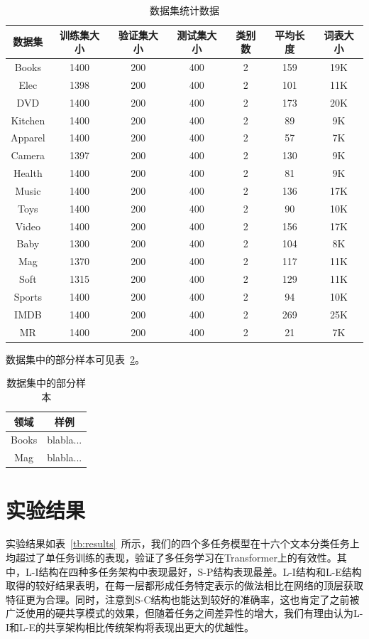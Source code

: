 \begin{table}[htb]
	\centering
	\caption{数据集统计数据}
	\begin{tabular}{ccccccc}
		\toprule[2pt]
		数据集&训练集大小&验证集大小&测试集大小&类别数&平均长度&词表大小\\
		\midrule[1pt]
		Books& 1400& 200& 400& 2& 159& 19K\\
		Elec& 1398& 200& 400& 2& 101& 11K\\
		DVD& 1400& 200& 400& 2& 173& 20K\\
		Kitchen& 1400& 200& 400& 2& 89& 9K\\
		Apparel& 1400& 200& 400& 2& 57& 7K\\
		Camera& 1397& 200& 400& 2& 130& 9K\\
		Health& 1400& 200& 400& 2& 81& 9K\\
		Music& 1400& 200& 400& 2& 136& 17K\\
		Toys& 1400& 200& 400& 2& 90& 10K\\
		Video& 1400& 200& 400& 2& 156& 17K\\
		Baby& 1300& 200& 400& 2& 104& 8K\\
		Mag& 1370& 200& 400& 2& 117& 11K\\
		Soft& 1315& 200& 400& 2& 129& 11K\\
		Sports& 1400& 200& 400& 2& 94& 10K\\
		IMDB& 1400& 200& 400& 2& 269& 25K\\
		MR& 1400& 200& 400& 2& 21& 7K\\
		\bottomrule[2pt]
	\end{tabular}
	\label{tb:dataset}
\end{table}

数据集中的部分样本可见表~\ref{tb:examples}。
\begin{table}[htb]
\centering
\caption{数据集中的部分样本}
\begin{tabular}{cc}
\toprule[2pt]
领域&样例\\
\midrule[1pt]
Books&blabla...\\
Mag&blabla...\\
\bottomrule[2pt]
\end{tabular}
\label{tb:examples}
\end{table}
\section{实验结果}
\label{sec:results}
实验结果如表~\ref{tb:results}~所示，我们的四个多任务模型在十六个文本分类任务上均超过了单任务训练的表现，验证了多任务学习在Transformer上的有效性。其中，L-I结构在四种多任务架构中表现最好，S-P结构表现最差。L-I结构和L-E结构取得的较好结果表明，在每一层都形成任务特定表示的做法相比在网络的顶层获取特征更为合理。同时，注意到S-C结构也能达到较好的准确率，这也肯定了之前被广泛使用的硬共享模式的效果，但随着任务之间差异性的增大，我们有理由认为L-I和L-E的共享架构相比传统架构将表现出更大的优越性。

